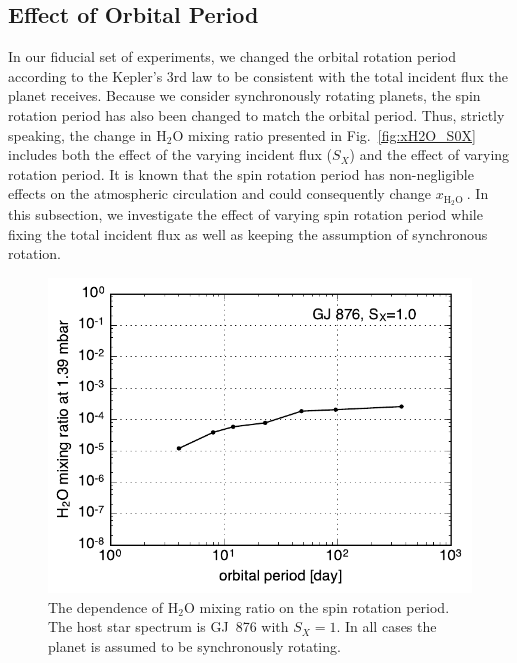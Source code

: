 \documentclass[11pt,numberedappendix,twocolappendix,]{emulateapj}
\def\water{H$_2$O }
\def\xwater{\dsa{$x_\text{\water}$}}
\newcommand{\dsa}[1]{{\color{blue}#1}}
\begin{document}
\subsection{Effect of Orbital Period}
\label{ss:sensitivity_Porbit}

In our fiducial set of experiments, we changed the orbital rotation period according to the Kepler's 3rd law to be consistent with the total incident flux the planet receives. 
Because we consider synchronously rotating planets, the spin rotation period has also been changed to match the orbital period. 
Thus, strictly speaking, the change in \water mixing ratio presented in Fig.~\ref{fig:xH2O_S0X} includes both the effect of the varying incident flux ($S_X$) and the effect of varying rotation period. 
It is known that the spin rotation period has non-negligible effects on the atmospheric circulation \citep{Yang2013, Kopparapu2016, Way2016} and \dsa{could consequently} change \xwater. 
In this subsection, we \dsa{investigate} the effect of varying spin rotation period while fixing the total incident flux as well as keeping the assumption of synchronous rotation. 


\begin{figure}[!h]
    \begin{center}
    \includegraphics[width=\hsize]{fig/xH2O_Prot.pdf}
    \end{center}
\caption{The dependence of \water mixing ratio on the spin rotation period. The host star spectrum is GJ~876 with $S_X=1$. In all cases the planet is assumed to be synchronously rotating. }
\label{fig:changeP}
\end{figure}
\end{document}
